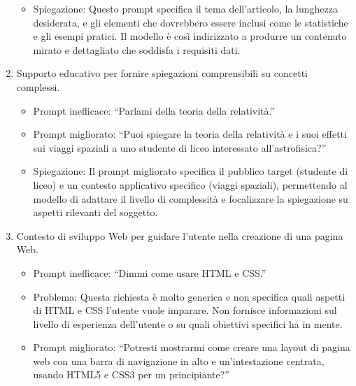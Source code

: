 \begin{enumerate}
\begin{itemize}
                    \item Spiegazione: Questo prompt specifica il tema dell'articolo, la lunghezza desiderata, e gli elementi che dovrebbero essere inclusi come le statistiche e gli esempi pratici. Il modello è così indirizzato a produrre un contenuto mirato e dettagliato che soddisfa i requisiti dati.
                \end{itemize}

                \item Supporto educativo per fornire spiegazioni comprensibili su concetti complessi.
                \begin{itemize}
                    \item Prompt inefficace: ``Parlami della teoria della relatività.''
                    
                    \item Prompt migliorato: ``Puoi spiegare la teoria della relatività e i suoi effetti sui viaggi spaziali a uno studente di liceo interessato all'astrofisica?''
                    
                    \item Spiegazione: Il prompt migliorato specifica il pubblico target (studente di liceo) e un contesto applicativo specifico (viaggi spaziali), permettendo al modello di adattare il livello di complessità e focalizzare la spiegazione su aspetti rilevanti del soggetto.
                \end{itemize}

                \item Contesto di sviluppo Web per guidare l’utente nella creazione di una pagina Web.
                \begin{itemize}
                    \item Prompt inefficace: ``Dimmi come usare HTML e CSS.''
                    
                    \item Problema: Questa richiesta è molto generica e non specifica quali aspetti di HTML e CSS l'utente vuole imparare. Non fornisce informazioni sul livello di esperienza dell'utente o su quali obiettivi specifici ha in mente.
                    
                    \item Prompt migliorato: ``Potresti mostrarmi come creare una layout di pagina web con una barra di navigazione in alto e un'intestazione centrata, usando HTML5 e CSS3 per un principiante?''
                    

\end{itemize}
\end{enumerate}
